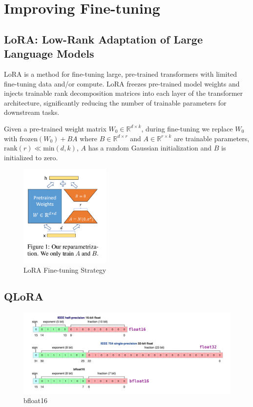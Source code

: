 \documentclass[11pt]{article}
\theoremstyle{definition}
\begin{document}
\section{Improving Fine-tuning}

\subsection{LoRA: Low-Rank Adaptation of Large Language Models \cite{hu2021lora}}

LoRA is a method for fine-tuning large, pre-trained transformers with limited fine-tuning data and/or compute. LoRA freezes pre-trained model weights and injects trainable rank decomposition matrices into each layer of the transformer architecture, significantly reducing the number of trainable parameters for downstream tasks.

Given a pre-trained weight matrix $W_0 \in \mathbb{R}^{d \times k}$, during fine-tuning we replace $W_0$ with $\mathrm{frozen}(W_0) + BA$ where $B \in \mathbb{R}^{d \times r}$ and $A \in \mathbb{R}^{r \times k}$ are trainable parameters, $\mathrm{rank}(r) \ll \mathrm{min}(d,k)$, $A$ has a random Gaussian initialization and $B$ is initialized to zero.

\begin{figure}
\centering
  \includegraphics[width=0.4\textwidth]{transformers/lora_overview.png}
  \caption{LoRA Fine-tuning Strategy \cite{DBLP:journals/corr/abs-2106-09685}}
  \label{fig:lora-overview}
\end{figure}

\subsection{QLoRA}

\begin{figure}
\centering
  \includegraphics[width=\textwidth,height=\textheight,keepaspectratio]{transformers/bfloat16.png}
  \caption{bfloat16 \cite{bfloat16img}}
  \label{fig:bfloat16}
\end{figure}
\end{document}
